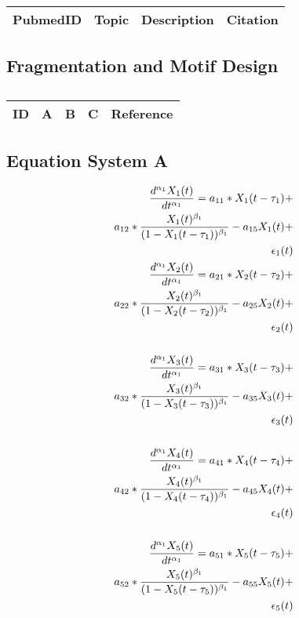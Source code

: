 \centering	
\begin{table}[H]\tiny
	\caption{}	
	\begin{tabular}{rp{1cm}|p{4cm}|l}
		\hline	
		PubmedID & Topic & Description & Citation \\
		\hline 
		\hline 
	\end{tabular}
\end{table}

\subsection{Fragmentation and Motif Design}

\centering
\begin{table}[H]\footnotesize
	\caption{}
	\begin{tabular}{rp{1cm}p{2cm}p{3cm}p{1cm}}
		\hline
		ID & A & B & C & Reference \\
		\hline
		\hline
	\end{tabular}
\end{table}
\raggedright

\subsection{Equation System A}

\begin{align*} 
\tiny
\frac{d^{\alpha_1}X_1(t)}{dt^{\alpha_1}} = a_{11} *X_1(t - \tau_1) + \\
a_{12} *\frac{X_1(t)^{\beta_1}}{(1-X_1(t - \tau_1))^{\beta_1}} - a_{15}X_1(t) + \\
\epsilon_1(t) \\
\frac{d^{\alpha_1}X_2(t)}{dt^{\alpha_1}} = a_{21} *X_2(t - \tau_2) + \\
a_{22} *\frac{X_2(t)^{\beta_1}}{(1-X_2(t - \tau_2))^{\beta_1}} - a_{25}X_2(t) + \\
\epsilon_2(t) \\ \\
\frac{d^{\alpha_1}X_3(t)}{dt^{\alpha_1}} = a_{31} *X_3(t - \tau_3) + \\
a_{32} *\frac{X_3(t)^{\beta_1}}{(1-X_3(t - \tau_3))^{\beta_1}} - a_{35}X_3(t) + \\
\epsilon_3(t) \\ \\
\frac{d^{\alpha_1}X_4(t)}{dt^{\alpha_1}} = a_{41} *X_4(t - \tau_4) + \\
a_{42} *\frac{X_4(t)^{\beta_1}}{(1-X_4(t - \tau_4))^{\beta_1}} - a_{45}X_4(t) + \\
\epsilon_4(t) \\ \\
\frac{d^{\alpha_1}X_5(t)}{dt^{\alpha_1}} = a_{51} *X_5(t - \tau_5) + \\
a_{52} *\frac{X_5(t)^{\beta_1}}{(1-X_5(t - \tau_5))^{\beta_1}} - a_{55}X_5(t) + \\
\epsilon_5(t) \\
\end{align*}

